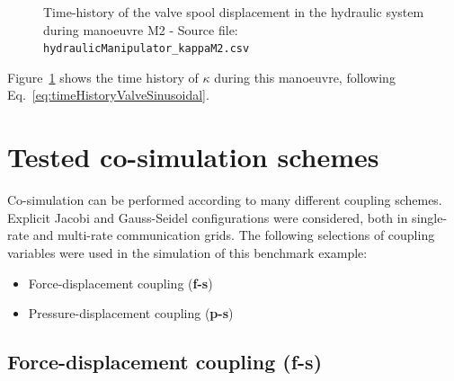 \documentclass[fleqn,11pt]{article}
\begin{document}
\begin{figure}[ht]
	\centering
	\caption{Time-history of the valve spool displacement in the hydraulic system during manoeuvre M2 - Source file: \texttt{hydraulicManipulator{\_}kappaM2.csv}}
	\label{fig:valveTimeHistoryM2}
\end{figure}

Figure~\ref{fig:valveTimeHistoryM2} shows the time history of $\kappa$ during this manoeuvre, following Eq.~\eqref{eq:timeHistoryValveSinusoidal}.

\newpage
\section{Tested co-simulation schemes}
\label{TestedCosimSchemes}

Co-simulation can be performed according to many different coupling schemes.
Explicit Jacobi and Gauss-Seidel configurations were considered, both in single-rate and multi-rate communication grids.
The following selections of coupling variables were used in the simulation of this benchmark example:
\begin{itemize}
	\item{Force-displacement coupling (\textbf{f-s})} 
	\item{Pressure-displacement coupling (\textbf{p-s}) }
\end{itemize}

\subsection{Force-displacement coupling (f-s)}
\label{FSCoupling}
\end{document}
